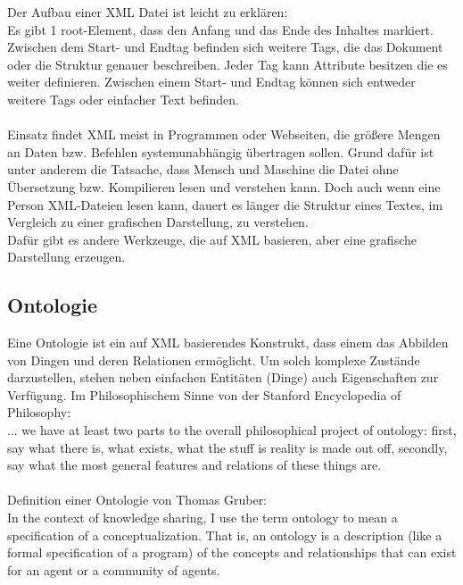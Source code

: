 

Der Aufbau einer \ac{XML} Datei ist leicht zu erklären:\\
Es gibt 1 root-Element, dass den Anfang und das Ende des Inhaltes markiert. Zwischen dem Start- und Endtag befinden sich weitere Tags, die das Dokument oder die Struktur genauer beschreiben. Jeder Tag kann Attribute besitzen die es weiter definieren. Zwischen einem Start- und Endtag können sich entweder weitere Tags oder einfacher Text befinden.
\\\\
Einsatz findet \ac{XML} meist in Programmen oder Webseiten, die größere Mengen an Daten bzw. Befehlen systemunabhängig übertragen sollen. Grund dafür ist unter anderem die Tatsache, dass Mensch und Maschine die Datei ohne Übersetzung bzw. Kompilieren lesen und verstehen kann. Doch auch wenn eine Person \ac{XML}-Dateien lesen kann, dauert es länger die Struktur eines Textes, im Vergleich zu einer grafischen Darstellung, zu verstehen.\\  
Dafür gibt es andere Werkzeuge, die auf \ac{XML} basieren, aber eine grafische Darstellung erzeugen.

\subsection{Ontologie}
Eine Ontologie ist ein auf \ac{XML} basierendes Konstrukt, dass einem das Abbilden von Dingen und deren Relationen ermöglicht. Um solch komplexe Zustände darzustellen, stehen neben einfachen Entitäten (Dinge) auch Eigenschaften zur Verfügung.
\newpage
Im Philosophischem Sinne von der Stanford Encyclopedia of Philosophy:\\
\glqq ... we have at least two parts to the overall philosophical project of ontology: first, say what there is, what exists, what the stuff is reality is made out off, secondly, say what the most general features and relations of these things are.\grqq \cite{ontology_stanford} \\
\\
Definition einer Ontologie von Thomas Gruber:\\
\glqq In the context of knowledge sharing, I use the term ontology to mean a specification of a conceptualization. That is, an ontology is a description (like a formal specification of a program) of the concepts and relationships that can exist for an agent or a community of agents.\grqq \cite{onto_def}\\

